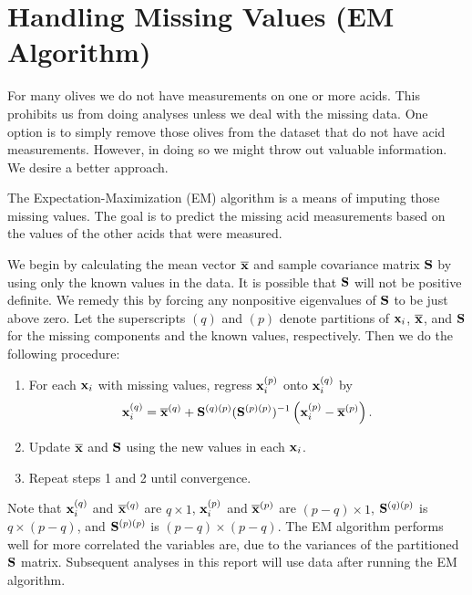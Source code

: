\section{Handling Missing Values (EM Algorithm)}

For many olives we do not have measurements on one or more acids. This prohibits us from doing analyses unless we deal with the missing data. One option is to simply remove those olives from the dataset that do not have acid measurements. However, in doing so we might throw out valuable information. We desire a better approach.

The Expectation-Maximization (EM) algorithm is a means of imputing those missing values. The goal is to predict the missing acid measurements based on the values of the other acids that were measured.

We begin by calculating the mean vector $\overline{\mathbf{\bm{x}}}$ and sample covariance matrix $\mathbf{\bm{S}}$ by using only the known values in the data. It is possible that $\mathbf{\bm{S}}$ will not be positive definite. We remedy this by forcing any nonpositive eigenvalues of $\mathbf{\bm{S}}$ to be just above zero. Let the superscripts $(q)$ and $(p)$ denote partitions of $\mathbf{\bm{x}}_i$, $\overline{\mathbf{\bm{x}}}$, and $\mathbf{\bm{S}}$ for the missing components and the known values, respectively. Then we do the following procedure:

\begin{enumerate}
\item For each $\mathbf{\bm{x}}_i$ with missing values, regress $\mathbf{\bm{x}}_i^{(p)}$ onto $\mathbf{\bm{x}}_i^{(q)}$ by
\begin{eqnarray*}
\mathbf{\bm{x}}_i^{(q)} = \overline{\mathbf{\bm{x}}}^{(q)} + \mathbf{\bm{S}}^{(q)(p)}(\mathbf{\bm{S}}^{(p)(p)})^{-1}\left(\mathbf{\bm{x}}_i^{(p)}-\overline{\mathbf{\bm{x}}}^{(p)}\right). 
\end{eqnarray*}
\item Update $\overline{\mathbf{\bm{x}}}$ and $\mathbf{\bm{S}}$ using the new values in each $\mathbf{\bm{x}}_i$.
\item Repeat steps 1 and 2 until convergence.
\end{enumerate}

\noindent Note that $\mathbf{\bm{x}}_i^{(q)}$ and $\overline{\mathbf{\bm{x}}}^{(q)}$ are $q\times1$, $\mathbf{\bm{x}}_i^{(p)}$ and $\overline{\mathbf{\bm{x}}}^{(p)}$ are $(p-q)\times1$, $\mathbf{\bm{S}}^{(q)(p)}$ is $q\times(p-q)$, and $\mathbf{\bm{S}}^{(p)(p)}$ is $(p-q)\times(p-q)$. The EM algorithm performs well for more correlated the variables are, due to the variances of the partitioned $\mathbf{\bm{S}}$ matrix. Subsequent analyses in this report will use data after running the EM algorithm.

